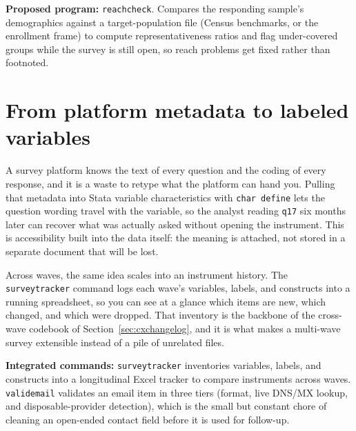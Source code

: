 \documentclass[
    a4paper,
    fontsize=10pt,
    twoside=true,
    numbers=noenddot,
]{kaobook}
\begin{document}
\begin{kaobox}[frametitle=Ado-file Idea: \texttt{reachcheck}]
\textbf{Proposed program:} \texttt{reachcheck}. Compares the responding sample's demographics against a target-population file (Census benchmarks, or the enrollment frame) to compute representativeness ratios and flag under-covered groups while the survey is still open, so reach problems get fixed rather than footnoted.
\end{kaobox}

\section{From platform metadata to labeled variables}
A survey platform knows the text of every question and the coding of every response, and it is a waste to retype what the platform can hand you. Pulling that metadata into Stata variable characteristics with \texttt{char define} lets the question wording travel with the variable, so the analyst reading \texttt{q17} six months later can recover what was actually asked without opening the instrument. This is accessibility built into the data itself: the meaning is attached, not stored in a separate document that will be lost.

Across waves, the same idea scales into an instrument history. The \texttt{surveytracker} command logs each wave's variables, labels, and constructs into a running spreadsheet, so you can see at a glance which items are new, which changed, and which were dropped. That inventory is the backbone of the cross-wave codebook of Section~\ref{sec:cxchangelog}, and it is what makes a multi-wave survey extensible instead of a pile of unrelated files.

\begin{kaobox}[frametitle=Package Integration: \texttt{surveytracker} and \texttt{validemail}]
\textbf{Integrated commands:} \texttt{surveytracker} inventories variables, labels, and constructs into a longitudinal Excel tracker to compare instruments across waves. \texttt{validemail} validates an email item in three tiers (format, live DNS/MX lookup, and disposable-provider detection), which is the small but constant chore of cleaning an open-ended contact field before it is used for follow-up.
\end{kaobox}
\end{document}
